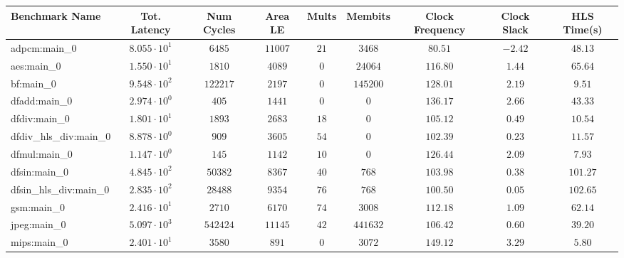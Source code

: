 \begin{tabular}{|l|c|c|c|c|c|c|c|c|}
\hline
Benchmark Name          & Tot. Latency           & Num Cycles & Area LE   & Mults   & Membits    & Clock Frequency & Clock Slack & HLS Time(s) \\
\hline
adpcm:main\_0           & $ 8.055 \cdot 10^{1} $ & $ 6485   $ & $ 11007 $ & $ 21  $ & $ 3468   $ & $ 80.51       $ & $ -2.42   $ & $ 48.13   $ \\
aes:main\_0             & $ 1.550 \cdot 10^{1} $ & $ 1810   $ & $ 4089  $ & $ 0   $ & $ 24064  $ & $ 116.80      $ & $ 1.44    $ & $ 65.64   $ \\
bf:main\_0              & $ 9.548 \cdot 10^{2} $ & $ 122217 $ & $ 2197  $ & $ 0   $ & $ 145200 $ & $ 128.01      $ & $ 2.19    $ & $ 9.51    $ \\
dfadd:main\_0           & $ 2.974 \cdot 10^{0} $ & $ 405    $ & $ 1441  $ & $ 0   $ & $ 0      $ & $ 136.17      $ & $ 2.66    $ & $ 43.33   $ \\
dfdiv:main\_0           & $ 1.801 \cdot 10^{1} $ & $ 1893   $ & $ 2683  $ & $ 18  $ & $ 0      $ & $ 105.12      $ & $ 0.49    $ & $ 10.54   $ \\
dfdiv\_hls\_div:main\_0 & $ 8.878 \cdot 10^{0} $ & $ 909    $ & $ 3605  $ & $ 54  $ & $ 0      $ & $ 102.39      $ & $ 0.23    $ & $ 11.57   $ \\
dfmul:main\_0           & $ 1.147 \cdot 10^{0} $ & $ 145    $ & $ 1142  $ & $ 10  $ & $ 0      $ & $ 126.44      $ & $ 2.09    $ & $ 7.93    $ \\
dfsin:main\_0           & $ 4.845 \cdot 10^{2} $ & $ 50382  $ & $ 8367  $ & $ 40  $ & $ 768    $ & $ 103.98      $ & $ 0.38    $ & $ 101.27  $ \\
dfsin\_hls\_div:main\_0 & $ 2.835 \cdot 10^{2} $ & $ 28488  $ & $ 9354  $ & $ 76  $ & $ 768    $ & $ 100.50      $ & $ 0.05    $ & $ 102.65  $ \\
gsm:main\_0             & $ 2.416 \cdot 10^{1} $ & $ 2710   $ & $ 6170  $ & $ 74  $ & $ 3008   $ & $ 112.18      $ & $ 1.09    $ & $ 62.14   $ \\
jpeg:main\_0            & $ 5.097 \cdot 10^{3} $ & $ 542424 $ & $ 11145 $ & $ 42  $ & $ 441632 $ & $ 106.42      $ & $ 0.60    $ & $ 39.20   $ \\
mips:main\_0            & $ 2.401 \cdot 10^{1} $ & $ 3580   $ & $ 891   $ & $ 0   $ & $ 3072   $ & $ 149.12      $ & $ 3.29    $ & $ 5.80    $ \\

\end{tabular}
